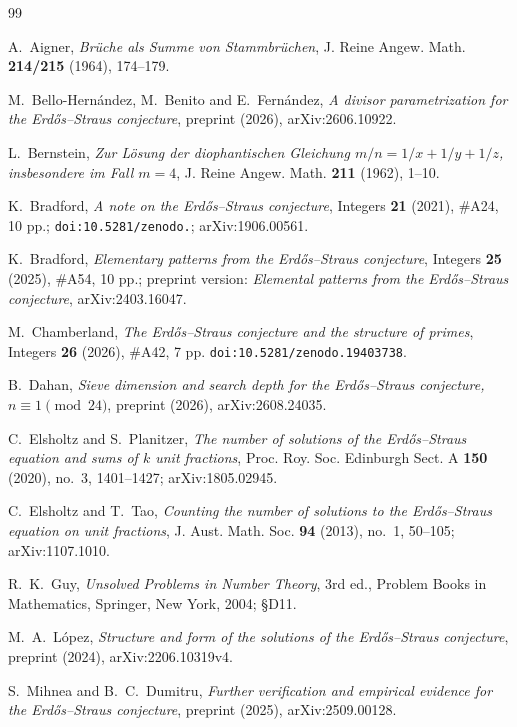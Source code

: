 \documentclass[11pt,reqno]{amsart}
\theoremstyle{plain}
\theoremstyle{definition}
\numberwithin{equation}{section}
\begin{document}
\begin{thebibliography}{99}

A.~Aigner,
\emph{Br\"uche als Summe von Stammbr\"uchen},
J. Reine Angew. Math. \textbf{214/215} (1964), 174--179.

M.~Bello-Hern\'andez, M.~Benito and E.~Fern\'andez,
\emph{A divisor parametrization for the Erd\H{o}s--Straus conjecture},
preprint (2026), arXiv:2606.10922.

L.~Bernstein,
\emph{Zur L\"osung der diophantischen Gleichung $m/n=1/x+1/y+1/z$, insbesondere im
Fall $m=4$},
J. Reine Angew. Math. \textbf{211} (1962), 1--10.

K.~Bradford,
\emph{A note on the Erd\H{o}s--Straus conjecture}, Integers \textbf{21}
(2021), \#A24, 10 pp.; \texttt{doi:10.5281/\allowbreak zenodo.}; arXiv:1906.00561.

K.~Bradford,
\emph{Elementary patterns from the Erd\H{o}s--Straus conjecture},
Integers \textbf{25} (2025), \#A54, 10 pp.;
preprint version: \emph{Elemental patterns from the Erd\H{o}s--Straus conjecture},
arXiv:2403.16047.

M.~Chamberland,
\emph{The Erd\H{o}s--Straus conjecture and the structure of primes},
Integers \textbf{26} (2026), \#A42, 7 pp.
\texttt{doi:10.5281/zenodo.19403738}.

B.~Dahan,
\emph{Sieve dimension and search depth for the Erd\H{o}s--Straus conjecture,
$n\equiv1\pmod{24}$},
preprint (2026), arXiv:2608.24035.

C.~Elsholtz and S.~Planitzer,
\emph{The number of solutions of the Erd\H{o}s--Straus equation and sums of $k$ unit
fractions},
Proc. Roy. Soc. Edinburgh Sect. A \textbf{150} (2020), no.~3, 1401--1427;
arXiv:1805.02945.

C.~Elsholtz and T.~Tao,
\emph{Counting the number of solutions to the Erd\H{o}s--Straus equation on unit
fractions},
J. Aust. Math. Soc. \textbf{94} (2013), no.~1, 50--105;
arXiv:1107.1010.

R.~K.~Guy,
\emph{Unsolved Problems in Number Theory}, 3rd ed.,
Problem Books in Mathematics, Springer, New York, 2004; \S D11.

M.~A.~L\'opez,
\emph{Structure and form of the solutions of the Erd\H{o}s--Straus conjecture},
preprint (2024), arXiv:2206.10319v4.

S.~Mihnea and B.~C.~Dumitru,
\emph{Further verification and empirical evidence for the Erd\H{o}s--Straus
conjecture},
preprint (2025), arXiv:2509.00128.


\end{thebibliography}
\end{document}
